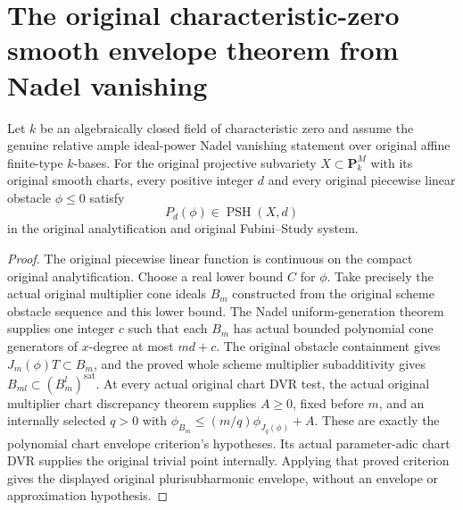 \section{The original characteristic-zero smooth envelope theorem from Nadel vanishing}

\begin{theorem}
\label{thm:c0n-original-integral-envelope-from-nadel}
\leanok
Let $k$ be an algebraically closed field of characteristic zero and assume
the genuine relative ample ideal-power Nadel vanishing statement over
original affine finite-type $k$-bases.
For the original projective subvariety $X\subset\mathbf P^M_k$ with its
original smooth charts, every positive integer $d$ and every original
piecewise linear obstacle $\phi\le0$ satisfy
\[
 P_d(\phi)\in\operatorname{PSH}(X,d)
\]
in the original analytification and original Fubini--Study system.
\end{theorem}
\begin{proof}
The original piecewise linear function is continuous on the compact
original analytification.  Choose a real lower bound $C$ for $\phi$.
Take precisely the actual original multiplier cone ideals $B_m$
constructed from the original scheme obstacle sequence and this lower
bound.  The Nadel uniform-generation theorem supplies one integer $c$
such that each $B_m$ has actual bounded polynomial cone generators of
$x$-degree at most $md+c$.
The original obstacle containment gives $J_m(\phi)T\subset B_m$, and the
proved whole scheme multiplier subadditivity gives
$B_{ml}\subset(B_m^l)^{\mathrm{sat}}$.
At every actual original chart DVR test, the actual original multiplier
chart discrepancy theorem supplies $A\ge0$, fixed before $m$, and an
internally selected $q>0$ with
$\phi_{B_m}\le(m/q)\phi_{J_q(\phi)}+A$.
These are exactly the polynomial chart envelope criterion's hypotheses.
Its actual parameter-adic chart DVR supplies the original trivial point
internally.  Applying that proved criterion gives the displayed original
plurisubharmonic envelope, without an envelope or approximation hypothesis.
\end{proof}

